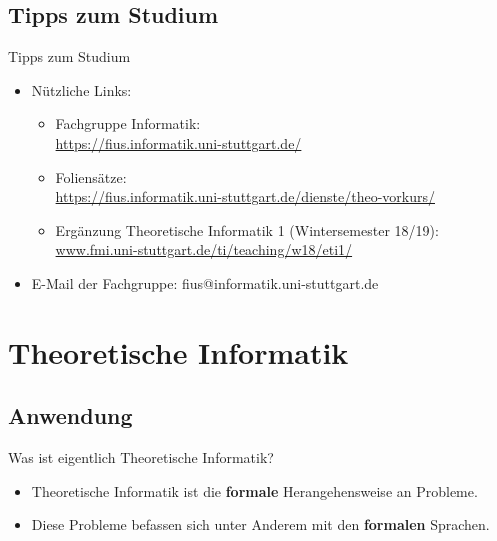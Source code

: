 \subsection{Tipps zum Studium}
\begin{frame}[fragile]{Tipps zum Studium}
    \begin{itemize}
        \item Nützliche Links:\\
            \begin{itemize}
                \item Fachgruppe Informatik:\\
                \url{https://fius.informatik.uni-stuttgart.de/}
                \item Foliensätze:\\ \url{https://fius.informatik.uni-stuttgart.de/dienste/theo-vorkurs/}
                 \item Ergänzung Theoretische Informatik 1 (Wintersemester 18/19): \\
                 \url{www.fmi.uni-stuttgart.de/ti/teaching/w18/eti1/}
            \end{itemize}
        \item E-Mail der Fachgruppe: fius@informatik.uni-stuttgart.de
            
    \end{itemize}
\end{frame}


\section{Theoretische Informatik}

\subsection{Anwendung}
\begin{frame}[fragile]{Was ist eigentlich Theoretische Informatik?}
    \begin{itemize} 
    \item Theoretische Informatik ist die \textbf{formale} Herangehensweise an Probleme.\\
    \item Diese Probleme befassen sich unter Anderem mit den \textbf{formalen} Sprachen.
    \end{itemize}
\end{frame}


